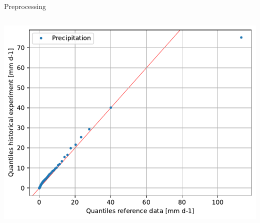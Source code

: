 \documentclass[aspectratio=169]{beamer}
\begin{document}
\begin{frame}{Preprocessing}
\begin{columns}[T]
\begin{column}{0.40\textwidth}
{\begin{center}
    \includegraphics[width=0.47\textheight]{precipitation_q-q_plot}
  \end{center}
  }
\end{column}
\end{columns}
\end{frame}
\end{document}
